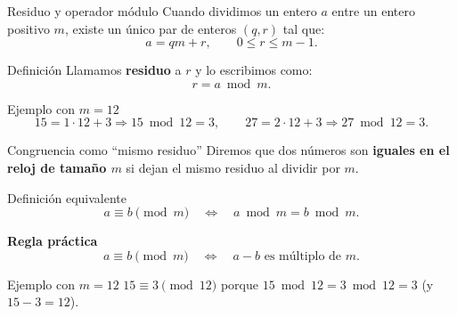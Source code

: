 \documentclass[aspectratio=1610, 9pt]{beamer}
\begin{document}
\begin{frame}{Residuo y operador módulo}
    Cuando dividimos un entero $a$ entre un entero positivo $m$, existe un único par de enteros $(q,r)$ tal que:
    \[
    a = qm + r,
    \qquad 0\le r \le m-1.
    \]

    \vspace{0.25cm}
    \begin{block}{Definición}
    Llamamos \textbf{residuo} a $r$ y lo escribimos como:
    \[
    r = a \bmod m.
    \]
    \end{block}

    \vspace{0.25cm}
    \begin{exampleblock}{Ejemplo con $m=12$}
        \[
        15 = 1\cdot 12 + 3 \Rightarrow 15\bmod 12 = 3,
        \qquad
        27 = 2\cdot 12 + 3 \Rightarrow 27\bmod 12 = 3.
        \]
    \end{exampleblock}
\end{frame}

\begin{frame}{Congruencia como ``mismo residuo''}
    Diremos que dos números son \textbf{iguales en el reloj de tamaño $m$} si dejan el mismo residuo al dividir por $m$.

    \vspace{0.25cm}
    \begin{block}{Definición equivalente}
    \[
    a \equiv b \pmod m
    \quad \Longleftrightarrow \quad
    a \bmod m = b \bmod m.
    \]
    \end{block}

    \vspace{0.25cm}
    \textbf{Regla práctica}
    \[
    a \equiv b \pmod m
    \quad \Longleftrightarrow \quad
    a-b \text{ es múltiplo de } m.
    \]

    \vspace{0.15cm}
    \begin{exampleblock}{Ejemplo con $m=12$}
        $15\equiv 3\pmod{12}$ porque $15\bmod 12=3\bmod 12=3$ (y $15-3=12$).
    \end{exampleblock}
\end{frame}
\end{document}
